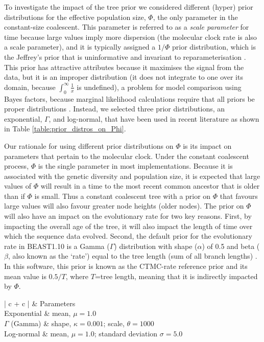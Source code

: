 \documentclass[10pt,letterpaper]{article}
\newlength\savedwidth
\newcommand\thickhline{\noalign{\global\savedwidth\arrayrulewidth\global\arrayrulewidth 2pt}%
\hline
\noalign{\global\arrayrulewidth\savedwidth}}
\begin{document}
To investigate the impact of the tree prior we considered different (hyper) prior distributions for the effective population size, $\Phi$, the only parameter in the constant-size coalescent. This parameter is referred to as a \textit{scale parameter} for time because large values imply more dispersion (the molecular clock rate is also a scale parameter), and it is typically assigned a $1/\Phi$ prior distribution, which is the Jeffrey's prior that is uninformative and invariant to reparameterisation  \cite{drummond2002estimating}. This prior has attractive attributes because it maximises the signal from the data, but it is an improper distribution (it does not integrate to one over its domain, because $\int_{0}^{\infty} \frac{1}{x}$ is undefined), a problem for model comparison using Bayes factors, because marginal likelihood calculations require that all priors be proper distributions \cite{r2019marginal, baele2013proper}. Instead, we selected three prior distributions, an exponential, $\Gamma$, and log-normal, that have been used in recent literature as shown in Table \ref{table:prior_distros_on_Phi}.

Our rationale for using different prior distributions on $\Phi$ is its impact on parameters that pertain to the molecular clock. Under the constant coalescent process, $\Phi$ is the single parameter in most implementations. Because it is associated with the genetic diversity and population size, it is expected that large values of $\Phi$ will result in a time to the most recent common ancestor that is older than if $\Phi$ is small. Thus a constant coalescent tree with a prior on $\Phi$ that favours large values will also favour greater node heights (older nodes). The prior on $\Phi$ will also have an impact on the evolutionary rate for two key reasons. First, by impacting the overall age of the tree, it will also impact the length of time over which the sequence data evolved. Second, the default prior for the evolutionary rate in BEAST1.10 is a Gamma ($\Gamma$) distribution with shape ($\alpha$) of 0.5 and beta ($\beta$, also known as the `rate') equal to the tree length (sum of all branch lengths) \cite{wang2014priors, ferreira2008bayesian}. In this software, this prior is known as the CTMC-rate reference prior and its mean value is $0.5 / T$, where $T$=tree length, meaning that it is indirectly impacted by $\Phi$. 

\begin{table}[h]
\caption{Prior distributions for the effective population size, $\Phi$ parameter}
\begin{center} 
	\label{table:prior_distros_on_Phi}
	\begin{tabular}{| c + c |}
    \hline
		 & Parameters\\ \thickhline
		Exponential & mean, $\mu=1.0$\\ \hline
        $\Gamma$ (Gamma) & shape, $\kappa=0.001$; scale, $\theta=1000$\\ \hline
		Log-normal & mean, $\mu=1.0$; standard deviation $\sigma=5.0$\\ \hline
	\end{tabular}
\end{center}
\end{table}
\end{document}
